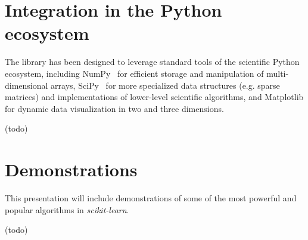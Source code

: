 \documentclass{article}
\newcommand{\sklearn}{\textit{scikit-learn}\xspace}
\DeclareRobustCommand{\VAN}[3]{#2}
\begin{document}
\section*{Integration in the Python ecosystem}

The library has been designed to leverage standard tools of the scientific
Python ecosystem, including NumPy~\citep{vanderwalt2011} for efficient  storage
and manipulation of multi-dimensional arrays, SciPy~\citep{varoquaux2013scipy}
for more specialized data structures  (e.g. sparse matrices) and
implementations of lower-level scientific algorithms, and Matplotlib for
dynamic data visualization in two and three dimensions.

(todo)


\section*{Demonstrations}

This presentation will include demonstrations of some of the most powerful and
popular algorithms in \sklearn.

(todo)


{\small

\DeclareRobustCommand{\VAN}[3]{#3}

}
\end{document}
